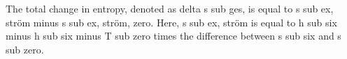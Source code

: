 The total change in entropy, denoted as delta s sub ges, is equal to s sub ex, ström minus s sub ex, ström, zero. Here, s sub ex, ström is equal to h sub six minus h sub six minus T sub zero times the difference between s sub six and s sub zero.